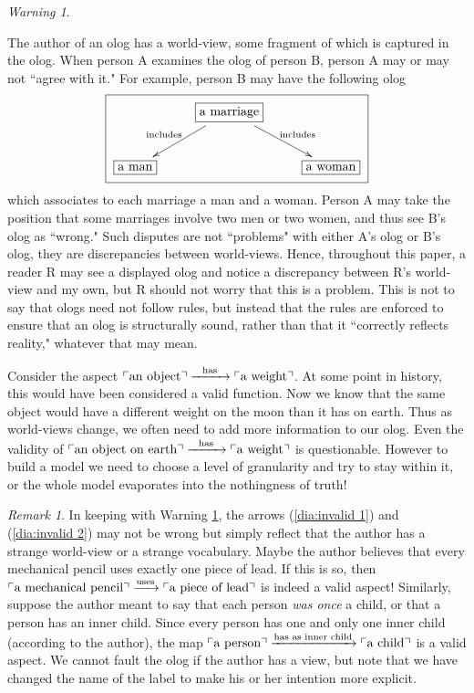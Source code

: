 \documentclass{book}
\def\tn{\textnormal}
\newcommand{\LA}[2]{\ar[#1]^-{\tn {#2}}}
\newcommand{\LAL}[2]{\ar[#1]_-{\tn {#2}}}
\newcommand{\fakebox}[1]{\tn{$\ulcorner$#1$\urcorner$}}
\newcommand{\To}[1]{\xrightarrow{#1}}
\newcommand{\Too}[1]{\xrightarrow{\ \ #1\ \ }}
\theoremstyle{remark}
\newtheorem{remark}[subsubsection]{Remark}
\newtheorem{warning}[subsubsection]{Warning}
\theoremstyle{definition}
\begin{document}
\begin{warning}\label{warn:worldview}

The author of an olog has a world-view, some fragment of which is captured in the olog.  When person A examines the olog of person B, person A may or may not ``agree with it."  For example, person B may have the following olog $$\fbox{\xymatrix{&\fbox{a marriage}\LA{dr}{ includes}\LAL{dl}{includes }\\\fbox{a man}&&\fbox{a woman}}}$$ which associates to each marriage a man and a woman.  Person A may take the position that some marriages involve two men or two women, and thus see B's olog as ``wrong."  Such disputes are not ``problems" with either A's olog or B's olog, they are discrepancies between world-views.  Hence, throughout this paper, a reader R may see a displayed olog and notice a discrepancy between R's world-view and my own, but R should not worry that this is a problem.  This is not to say that ologs need not follow rules, but instead that the rules are enforced to ensure that an olog is structurally sound, rather than that it ``correctly reflects reality," whatever that may mean.

Consider the aspect $\fakebox{an object}\Too{\tn{has}}\fakebox{a weight}$. At some point in history, this would have been considered a valid function. Now we know that the same object would have a different weight on the moon than it has on earth. Thus as world-views change, we often need to add more information to our olog. Even the validity of $\fakebox{an object on earth}\Too{\tn{has}}\fakebox{a weight}$ is questionable. However to build a model we need to choose a level of granularity and try to stay within it, or the whole model evaporates into the nothingness of truth!

\end{warning}

\begin{remark}

In keeping with Warning \ref{warn:worldview}, the arrows (\ref{dia:invalid 1}) and (\ref{dia:invalid 2}) may not be wrong but simply reflect that the author has a strange world-view or a strange vocabulary.  Maybe the author believes that every mechanical pencil uses exactly one piece of lead.  If this is so, then $\fakebox{a mechanical pencil}\To{\tn{uses}}\fakebox{a piece of lead}$ is indeed a valid aspect!   Similarly, suppose the author meant to say that each person {\em was once} a child, or that a person has an inner child.  Since every person has one and only one inner child (according to the author), the map $\fakebox{a person}\To{\tn{has as inner child}}\fakebox{a child}$ is a valid aspect.  We cannot fault the olog if the author has a view, but note that we have changed the name of the label to make his or her intention more explicit.

\end{remark}
\end{document}
